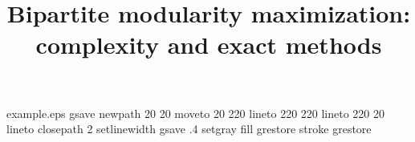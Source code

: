 %
%
%
%
%
\begin{filecontents*}{example.eps}
gsave
newpath
  20 20 moveto
  20 220 lineto
  220 220 lineto
  220 20 lineto
closepath
2 setlinewidth
gsave
  .4 setgray fill
grestore
stroke
grestore
\end{filecontents*}
%
\RequirePackage{fix-cm}
%
\documentclass[smallextended]{svjour3}       %
%
\smartqed  %
%
\usepackage{graphicx}
%
%
%

%
\smartqed  %
%
\usepackage{graphicx}
\usepackage{amssymb}
\usepackage{amsmath}
\usepackage{clrscode}
\usepackage{url}


%
%


\title{Bipartite modularity maximization: complexity and exact methods%
}


